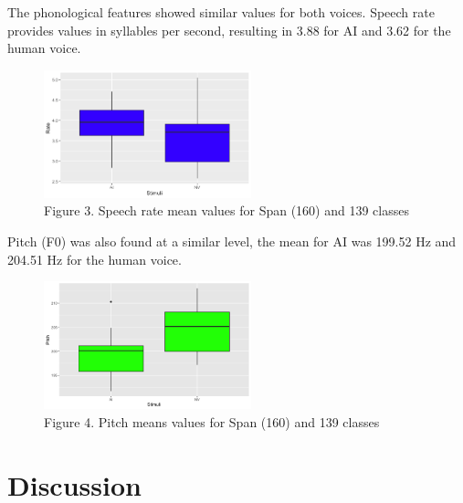\documentclass[
  a4paper,
  11pt,
  twocolumn]{article}
\begin{document}
The phonological features showed similar values for both voices. Speech
rate provides values in syllables per second, resulting in 3.88 for AI
and 3.62 for the human voice.

\begin{figure}[!ht]
\begin{center}
\includegraphics[width=6cm]{./includes/figures/rate.png}
\caption{Figure 3. Speech rate mean values for Span (160) and 139 classes}\label{fig:vowels}
\end{center}
\end{figure}

Pitch (F0) was also found at a similar level, the mean for AI was 199.52
Hz and 204.51 Hz for the human voice.

\begin{figure}[!ht]
\begin{center}
\includegraphics[width=6cm]{./includes/figures/pitch}
\caption{Figure 4. Pitch means values for Span (160) and 139 classes}\label{fig:vowels}
\end{center}
\end{figure}

\section{Discussion}
\end{document}
